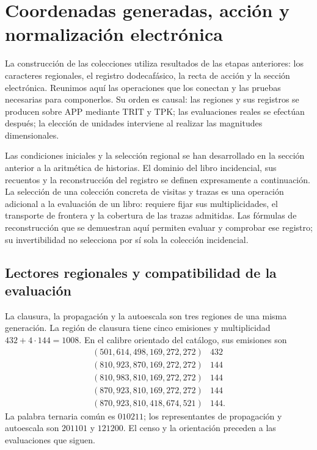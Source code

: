 \section{Coordenadas generadas, acción y normalización electrónica}
\label{vi:dep:seccion}

La construcción de las colecciones utiliza resultados de las etapas anteriores:
los caracteres regionales, el registro dodecafásico, la recta de acción y la
sección electrónica. Reunimos aquí las operaciones que los conectan y las
pruebas necesarias para componerlos. Su orden es causal: las regiones y sus
registros se producen sobre APP mediante TRIT y TPK; las evaluaciones reales
se efectúan después; la elección de unidades interviene al realizar las
magnitudes dimensionales.

Las condiciones iniciales y la selección regional se han desarrollado en
la sección anterior a la aritmética de historias. El dominio del libro
incidencial, sus recuentos y la reconstrucción del registro se definen
expresamente a continuación. La selección de una colección concreta de
visitas y trazas es una operación adicional a la evaluación de un libro:
requiere fijar sus multiplicidades, el transporte de frontera y la
cobertura de las trazas admitidas. Las fórmulas de reconstrucción que se
demuestran aquí permiten evaluar y comprobar ese registro; su
invertibilidad no selecciona por sí sola la colección incidencial.

\subsection{Lectores regionales y compatibilidad de la evaluación}
\label{vi:dep:regiones}

La clausura, la propagación y la autoescala son tres regiones de una misma
generación. La región de clausura tiene cinco emisiones y multiplicidad
\(432+4\cdot144=1008\). En el calibre orientado del catálogo, sus emisiones
son
\[
\begin{array}{c|r}
(501,614,498,169,272,272)&432\\
(810,923,870,169,272,272)&144\\
(810,983,810,169,272,272)&144\\
(870,923,810,169,272,272)&144\\
(870,923,810,418,674,521)&144.
\end{array}
\]
La palabra ternaria común es \(010211\); los representantes de propagación
y autoescala son \(201101\) y \(121200\). El censo y la orientación
preceden a las evaluaciones que siguen.

